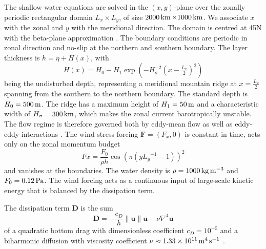 The shallow water equations are solved in the $(x,y)$-plane over the zonally periodic rectangular domain $L_x \times L_y$,
of size $2000\operatorname{km} \times 1000\operatorname{km}$. We associate $x$ with the zonal and $y$ with the meridional direction. The domain
is centred at 45N with the beta-plane approximation \citep{Vallis2006}. The boundary conditions are periodic in zonal direction
and no-slip at the northern and southern boundary. The layer thickness is $h = \eta + H(x)$, with
\begin{equation}
H(x) = H_0 - H_1\exp\left(-H_\sigma^{-2}(x-\tfrac{L_x}{2})^2\right)
\end{equation}
being the undisturbed depth, representing a meridional mountain ridge at $x=\tfrac{L_x}{2}$ spanning from the southern to
the northern boundary. The standard depth is $H_0 = 500\operatorname{m}$. The ridge has a maximum height of $H_1 = 50\operatorname{m}$
and a characteristic width of $H_\sigma = 300\operatorname{km}$, which makes the zonal current barotropically unstable. The flow
regime is therefore governed both by eddy-mean flow as well as eddy-eddy interactions \citep{Ferrari2010}. The wind stress
forcing $\mathbf{F} = (F_x,0)$ is constant in time, acts only on the zonal momentum budget
\begin{equation}
Fx = \frac{F_0}{\rho h} \cos\left(\pi\left(y{L_y}^{-1} - 1\right)\right)^2
\end{equation}
and vanishes at the boundaries. The water density is $\rho = 1000\operatorname{kg}\operatorname{m}^{-3}$ and $F_0 = 0.12\operatorname{Pa}$.
The wind forcing acts as a continuous input of large-scale kinetic energy that is balanced by the dissipation term.

The dissipation term $\mathbf{D}$ is the sum
\begin{equation}
\mathbf{D} = -\frac{c_D}{h}\| \mathbf{u} \| \mathbf{u} - \nu \nabla^4 \mathbf{u}
\label{eq:diss}
\end{equation}
of a quadratic bottom drag with dimensionless coefficient $c_D = 10^{-5}$ \citep{Arbic2008}
and a biharmonic diffusion with viscosity coefficient $\nu \approx 1.33\times10^{11} \operatorname{m}^4\operatorname{s}^{-1}$ \citep{Griffies2000}.

